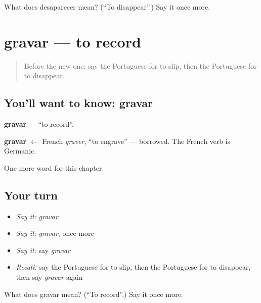 \begin{tcolorbox}[breakable,colback=teal!4,colframe=teal!35!black,title={Before you move on}]
What does desaparecer mean? (\textquotedblleft{}To disappear\textquotedblright{}.) Say it once more.
\end{tcolorbox}
\section[gravar]{gravar — to record}

\label{lesson:PT-C209-gravar}



\begin{quote}
Before the new one: say the Portuguese for to slip, then the Portuguese for to disappear.
\end{quote}

\subsection*{You'll want to know: gravar}
\textbf{gravar} — \textquotedblleft{}to record\textquotedblright{}.

\begin{cousinweb}
\textbf{gravar} $\leftarrow$ French \emph{graver}, \textquotedblleft{}to engrave\textquotedblright{} — borrowed. The French verb is Germanic.
\end{cousinweb}

\begin{grammarlens}[title={What you've built}]
One more word for this chapter.
\end{grammarlens}

\subsection*{Your turn}
\begin{itemize}
\raggedright
  \item \emph{Say it:} \emph{gravar}
  \item \emph{Say it:} \emph{gravar}, once more
  \item \emph{Say it:} say \emph{gravar}
  \item \emph{Recall:} say the Portuguese for to slip, then the Portuguese for to disappear, then say \emph{gravar} again
\end{itemize}

\begin{tcolorbox}[breakable,colback=teal!4,colframe=teal!35!black,title={Before you move on}]
What does gravar mean? (\textquotedblleft{}To record\textquotedblright{}.) Say it once more.
\end{tcolorbox}
